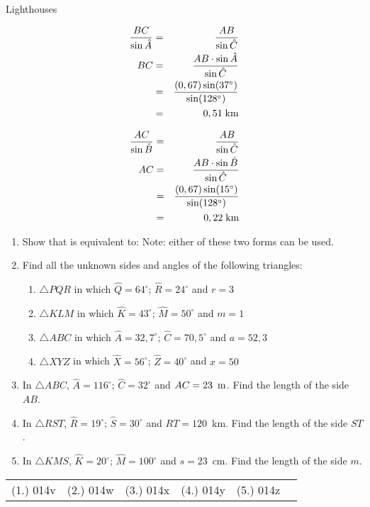 \begin{wex}{Lighthouses}
{\begin{eqnarray*}
\frac{BC}{\sin \hat{A}}&=&\frac{AB}{\sin \hat{C}}\\
BC&=&\frac{AB\cdot \sin \hat{A}}{\sin \hat{C}}\\
&=&\frac{(0,67) \sin(37^\circ)}{\sin(128^\circ)}\\
&=&0,51\;\rm{km}
\end{eqnarray*}

\begin{eqnarray*}
\frac{AC}{\sin \hat{B}}&=&\frac{AB}{\sin \hat{C}}\\
AC&=&\frac{AB\cdot \sin \hat{B}}{\sin \hat{C}}\\
&=&\frac{(0,67) \sin(15^\circ)}{\sin(128^\circ)}\\
&=&0,22\;\rm{km}
\end{eqnarray*}

}
\end{wex}

{
\begin{enumerate}
\item Show that
is equivalent to:
Note: either of these two forms can be used.
\item Find all the unknown sides and angles of the following triangles:
	\begin{enumerate}
	\item $\triangle PQR$ in which $\hat{Q} = 64^\circ$; $\hat{R} = 24^\circ$ and $r=3$
	\item $\triangle KLM$ in which $\hat{K} = 43^\circ$; $\hat{M} = 50^\circ$ and $m=1$
	\item $\triangle ABC$ in which $\hat{A} = 32,7^\circ$; $\hat{C} = 70,5^\circ$ and $a=52,3$
	\item $\triangle XYZ$ in which $\hat{X} = 56^\circ$; $\hat{Z} = 40^\circ$ and $x=50$
	\end{enumerate}
\item In $\triangle ABC$, $\hat{A} = 116^\circ$;  $\hat{C} = 32^\circ$ and $AC = 23~\,\rm{m}$. Find the length of the side $AB$.
\item In $\triangle RST$, $\hat{R} = 19^\circ$;  $\hat{S} = 30^\circ$ and $RT = 120$~km. Find the length of the side $ST$.
\item In $\triangle KMS$, $\hat{K} = 20^\circ$;  $\hat{M} = 100^\circ$ and $s = 23$~cm. Find the length of the side $m$.
\end{enumerate}


\par \practiceinfo
\par \begin{tabular}[h]{cccccc}
(1.)	014v	&
(2.)	014w	&
(3.)	014x	&
(4.)	014y	&
(5.)	014z	&
\end{tabular}}

